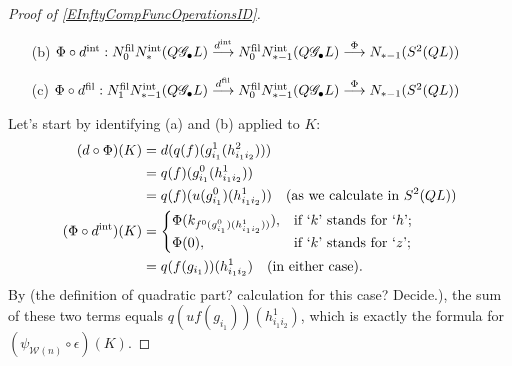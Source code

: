 \documentclass[11pt]{amsart}
\theoremstyle{plain}
\theoremstyle{definition}
\renewcommand{\to}{\longrightarrow}
\newcommand{\scrG}{\mathscr{G}}
\newcommand{\calW}{\mathcal{W}}
\theoremstyle{plain}
\newcommand{\BSWres}{{\scrG_\bullet}}
\begin{document}
\begin{Composite functor spectral sequences}
\begin{proof}[Proof of \ref{EInftyCompFuncOperationsID}]
\begin{enumerate}
\item[(b)] $\Phi\circ d^\textup{int}:N_0^\textup{fil}N_{*}^\textup{int}(Q\BSWres L)\overset{d^\textup{int}}{\to} N_0^\textup{fil}N_{*-1}^\textup{int}(Q\BSWres L)\overset{\Phi}{\to} N_{*-1}(S^2(QL))$
\item[(c)] $\Phi\circ d^\textup{fil}:N_1^\textup{fil}N_{*-1}^\textup{int}(Q\BSWres L)\overset{d^\textup{fil}}{\to} N_0^\textup{fil}N_{*-1}^\textup{int}(Q\BSWres L)\overset{\Phi}{\to} N_{*-1}(S^2(QL))$
\end{enumerate}
Let's start by identifying (a) and (b) applied to $K$:
\begin{alignat*}{2}
(d\circ\Phi)(K)&=d( q(f)(g^1_{i_1}(h^2_{i_1i_2})))\\
&=q(f)(g^0_{i_1}(h^1_{i_1i_2}))\\
&=q(f)(u(g^0_{i_1})(h^1_{i_1i_2}))\quad\textup{(as we calculate in $S^2(QL)$)}\\
(\Phi\circ d^\textup{int})(K)&=\begin{cases}
\Phi( k_{f^0(g^0_{i_1})(h^1_{i_1i_2}))}),&\textup{if `$k$' stands for `$h$'};\\
\Phi(0),&\textup{if `$k$' stands for `$z$'};
\end{cases}\\
&=q(f(g_{i_1}))(h^1_{i_1i_2})\quad\textup{(in either case).}
\end{alignat*}
By (the definition of quadratic part? calculation for this case? Decide.), the sum of these two terms equals $q(uf(g_{i_1}))(h^1_{i_1i_2})$, which is exactly the formula for $(\psi_{\calW(n)}\circ\epsilon)(K)$.


\end{proof}
\end{Composite functor spectral sequences}
\end{document}
